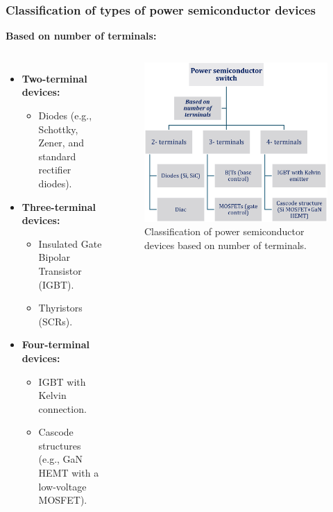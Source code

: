 \begin{frame}
	\frametitle{Classification of types of power semiconductor devices}
    \textbf{Based on number of terminals:}
    \begin{columns}
        \begin{itemize}
            \item \textbf{Two-terminal devices:}
            \begin{itemize}
                \item Diodes (e.g., Schottky, Zener, and standard rectifier diodes).
            \end{itemize}
            \item \textbf{Three-terminal devices:}
            \begin{itemize}
                \item Insulated Gate Bipolar Transistor (IGBT).
                \item Thyristors (SCRs).
            \end{itemize}
            \item \textbf{Four-terminal devices:}
            \begin{itemize}
                \item IGBT with Kelvin connection.
                \item Cascode structures (e.g., GaN HEMT with a low-voltage MOSFET).
            \end{itemize}
        \end{itemize}

        \begin{figure}
            \centering
            \label{fig:Classification_based_on_number_of_terminals}
            \includegraphics[scale=0.35]{fig/lec04/classification_of_device_1.eps}
            \caption{Classification of power semiconductor devices based on number of terminals.}
        \end{figure}
    \end{columns}
\end{frame}


